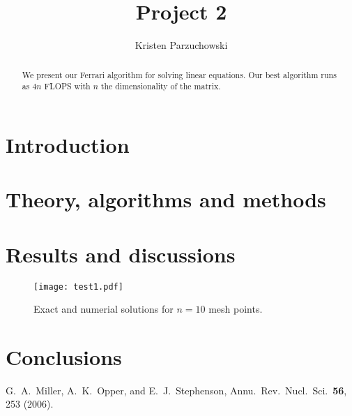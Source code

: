 \documentclass[10pt,showpacs,preprintnumbers,footinbib,amsmath,amssymb,aps,prl,twocolumn,groupedaddress,superscriptaddress,showkeys]{revtex4-1}
\begin{document}
\title{Project 2}
\author{Kristen Parzuchowski}
\begin{abstract}
We present our Ferrari algorithm for solving linear equations. Our best algorithm runs as $4n$ FLOPS with $n$ the dimensionality of the matrix.
\end{abstract}
\maketitle

\section{Introduction}

\section{Theory, algorithms and methods}

\section{Results and discussions}

\begin{figure}[hbtp]
\texttt{[image: test1.pdf]}
\caption{Exact and numerial solutions for $n=10$ mesh points.} 
\label{fig:n10points}
\end{figure}

\section{Conclusions}

\begin{thebibliography}{99}
 G.~A.~Miller, A.~K.~Opper, and E.~J.~Stephenson, Annu.~Rev.~Nucl.~Sci.~{\bf 56}, 253 (2006).
\end{thebibliography}
\end{document}
